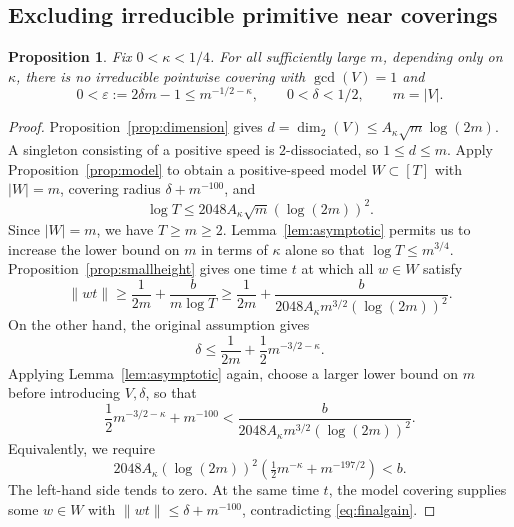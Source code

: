 \documentclass[12pt,leqno]{article}
\numberwithin{equation}{section}
\newtheorem{proposition}[theorem]{Proposition}
\theoremstyle{remark}
\newcommand{\LRdimension}{\operatorname{dim}_2}
\begin{document}
\subsection{Excluding irreducible primitive near coverings}
\begin{proposition}\label{prop:contradiction}
Fix $0<\kappa<1/4$. For all sufficiently large $m$, depending only on $\kappa$, there is no irreducible pointwise covering with $\gcd(V)=1$ and
\[
0<\varepsilon:=2\delta m-1\le m^{-1/2-\kappa},\qquad 0<\delta<1/2,
\qquad m=|V|.
\]
\end{proposition}
\begin{proof}
Proposition~\ref{prop:dimension} gives $d=\LRdimension(V)\le A_\kappa\sqrt m\log(2m)$. A singleton consisting of a positive speed is $2$-dissociated, so $1\le d\le m$. Apply Proposition~\ref{prop:model} to obtain a positive-speed model $W\subset[T]$ with $|W|=m$, covering radius $\delta+m^{-100}$, and
\[
\log T\le2048A_\kappa\sqrt m(\log(2m))^2.
\]
Since $|W|=m$, we have $T\ge m\ge2$. Lemma~\ref{lem:asymptotic} permits us to increase the lower bound on $m$ in terms of $\kappa$ alone so that $\log T\le m^{3/4}$. Proposition~\ref{prop:smallheight} gives one time $t$ at which all $w\in W$ satisfy
\begin{equation}\label{eq:finalgain}
\|wt\|\ge\frac1{2m}+\frac b{m\log T}
\ge\frac1{2m}+\frac b{2048A_\kappa m^{3/2}(\log(2m))^2}.
\end{equation}
On the other hand, the original assumption gives
\[
\delta\le\frac1{2m}+\frac12m^{-3/2-\kappa}.
\]
Applying Lemma~\ref{lem:asymptotic} again, choose a larger lower bound on $m$ before introducing $V,\delta$, so that
\[
\frac12m^{-3/2-\kappa}+m^{-100}
<\frac b{2048A_\kappa m^{3/2}(\log(2m))^2}.
\]
Equivalently, we require
\[
2048A_\kappa(\log(2m))^2
\left(\tfrac12m^{-\kappa}+m^{-197/2}\right)<b.
\]
The left-hand side tends to zero. At the same time $t$, the model covering supplies some $w\in W$ with $\|wt\|\le\delta+m^{-100}$, contradicting \eqref{eq:finalgain}.
\end{proof}
\end{document}
